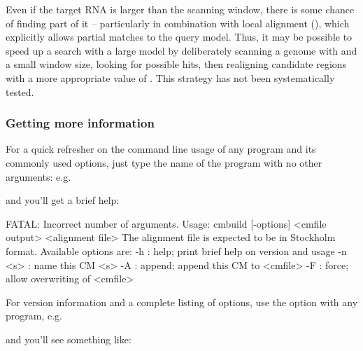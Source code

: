 Even if the target RNA is larger than the scanning window, there is
some chance of finding part of it -- particularly in combination with
local alignment (), which explicitly allows partial
matches to the query model. Thus, it may be possible to speed up a
search with a large model by deliberately scanning a genome with
 and a small window size, looking for possible hits,
then realigning candidate regions with a more appropriate value of
. This strategy has not been systematically tested.


\subsubsection{Getting more information}

For a quick refresher on the command line usage of any program and its
commonly used options, just type the name of the program with no other
arguments: e.g.\


and you'll get a brief help:

\begin{sreoutput}
FATAL: Incorrect number of arguments.
Usage: cmbuild [-options] <cmfile output> <alignment file>
The alignment file is expected to be in Stockholm format.
  Available options are:
   -h     : help; print brief help on version and usage
   -n <s> : name this CM <s>
   -A     : append; append this CM to <cmfile>
   -F     : force; allow overwriting of <cmfile>
\end{sreoutput}

For version information and a complete listing of options, use the
 option with any program, e.g.\


and you'll see something like:

